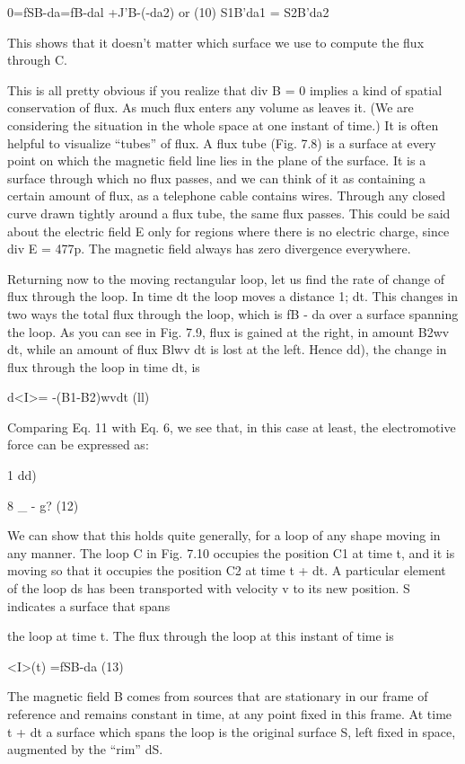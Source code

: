 0=fSB-da=fB-dal +J'B-(-da2)
or (10)
S1B'da1 = S2B'da2

This shows that it doesn't matter which surface we use to compute
the flux through C.

This is all pretty obvious if you realize that div B = 0 implies a
kind of spatial conservation of flux. As much flux enters any volume
as leaves it. (We are considering the situation in the whole space at
one instant of time.) It is often helpful to visualize ``tubes'' of flux.
A flux tube (Fig. 7.8) is a surface at every point on which the magnetic
field line lies in the plane of the surface. It is a surface through
which no flux passes, and we can think of it as containing a certain
amount of flux, as a telephone cable contains wires. Through any
closed curve drawn tightly around a flux tube, the same flux passes.
This could be said about the electric field E only for regions where
there is no electric charge, since div E = 477p. The magnetic field
always has zero divergence everywhere.

Returning now to the moving rectangular loop, let us find the rate
of change of flux through the loop. In time dt the loop moves a distance
1; dt. This changes in two ways the total flux through the loop,
which is fB - da over a surface spanning the loop. As you can see
in Fig. 7.9, flux is gained at the right, in amount B2wv dt, while an
amount of flux Blwv dt is lost at the left. Hence dd), the change in
flux through the loop in time dt, is

d<I>= -(B1-B2)wvdt (ll)

Comparing Eq. 11 with Eq. 6, we see that, in this case at least, the
electromotive force can be expressed as:

1 dd)

8 _ - g? (12)

We can show that this holds quite generally, for a loop of any shape
moving in any manner. The loop C in Fig. 7.10 occupies the position
C1 at time t, and it is moving so that it occupies the position C2 at
time t + dt. A particular element of the loop ds has been transported
with velocity v to its new position. S indicates a surface that spans

the loop at time t. The flux through the loop at this instant of time is

<I>(t) =fSB-da (13)

The magnetic field B comes from sources that are stationary in our
frame of reference and remains constant in time, at any point fixed
in this frame. At time t + dt a surface which spans the loop is the
original surface S, left fixed in space, augmented by the ``rim'' dS.

